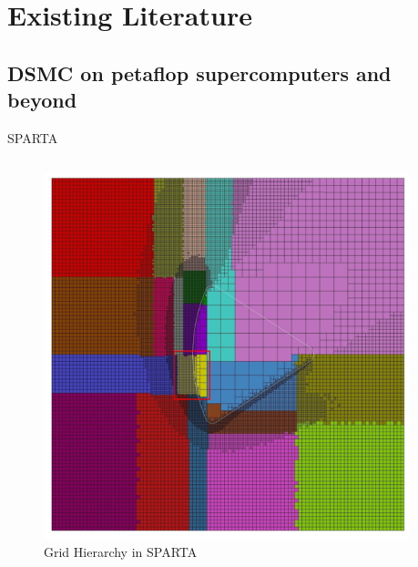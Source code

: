 \documentclass{beamer}
\begin{document}
\section{Existing Literature}

    \subsection{DSMC on petaflop supercomputers and beyond \cite{plimpton2019direct}}

        \begin{frame}{SPARTA}
            \begin{columns}
                \begin{column}{0.5\linewidth}
                    \begin{figure}
                        \centering
                        \includegraphics[width=\linewidth]{Pictures/Literature/Grid.png}
                        \caption{Grid Hierarchy in SPARTA}
                        \label{Grid}
                    \end{figure}
                \end{column}
        
                \begin{column}{0.5\linewidth}
                    \begin{itemize}
                        \setlength\itemsep{0.25cm}
                        

\end{itemize}
\end{column}
\end{columns}
\end{frame}
\end{document}
